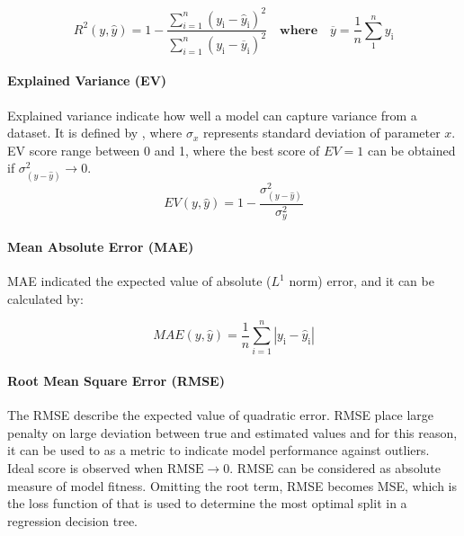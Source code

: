 \begin{equation}\label{eqn:rsquared}
    R^2(y,\hat{y}) = 1 - \frac{\sum_{i = 1}^{n} (y_{\text{i}} - \hat{y}_{\text{i}} )^2 }{\sum_{i = 1}^{n} (y_{\text{i}} - \overline{y}_{\text{i}})^2} \quad \textbf{where} \quad \overline{y} = \frac{1}{n}\sum_{1}^{n} y_\text{i}
\end{equation}

\paragraph{Explained Variance (EV)}\label{expVar}

Explained variance indicate how well a model can capture variance from a dataset. It is defined by , where $\sigma_x$ represents standard deviation of parameter $x$. EV score range between 0 and 1, where the best score of $EV = 1$ can be obtained if $\sigma^2_{(y-\hat{y})} \rightarrow 0$.\\  

\begin{equation}\label{eqn:expVar}
    EV(y,\hat{y}) = 1 - \frac{\sigma^2_{(y-\hat{y})}}{\sigma^2_{y}}
\end{equation}

\paragraph{Mean Absolute Error (MAE)}\label{MAE}

MAE indicated the expected value of absolute ($L^1$ norm) error, and it can be calculated by:

\begin{equation}\label{eqn:MAE}
    MAE(y,\hat{y}) = \frac{1}{n}\sum_{i=1}^{n} |y_{\text{i}} - \hat{y}_{\text{i}}| 
\end{equation}

\paragraph{Root Mean Square Error (RMSE)}\label{RMSE}

The RMSE describe the expected value of quadratic error. RMSE place large penalty on large deviation between true and estimated values and for this reason, it can be used to as a metric to indicate model performance against outliers. Ideal score is observed when $\text{RMSE} \rightarrow 0$. RMSE can be considered as absolute measure of model fitness. Omitting the root term, RMSE becomes MSE, which is the loss function of  that is used to determine the most optimal split in a regression decision tree.\\

